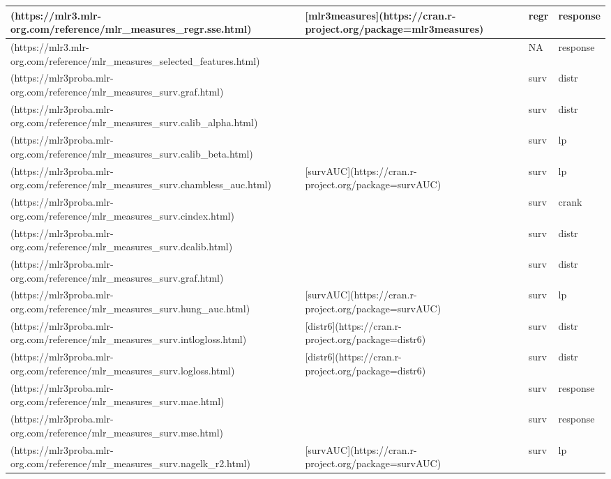 \documentclass[
]{scrbook}
\begin{document}
\begin{tabular}{l|l|l|l}
\hline
[`regr.sse`](https://mlr3.mlr-org.com/reference/mlr\_measures\_regr.sse.html) & [mlr3measures](https://cran.r-project.org/package=mlr3measures) & regr & response\\
\hline
[`selected\_features`](https://mlr3.mlr-org.com/reference/mlr\_measures\_selected\_features.html) &  & NA & response\\
\hline
[`surv.brier`](https://mlr3proba.mlr-org.com/reference/mlr\_measures\_surv.graf.html) &  & surv & distr\\
\hline
[`surv.calib\_alpha`](https://mlr3proba.mlr-org.com/reference/mlr\_measures\_surv.calib\_alpha.html) &  & surv & distr\\
\hline
[`surv.calib\_beta`](https://mlr3proba.mlr-org.com/reference/mlr\_measures\_surv.calib\_beta.html) &  & surv & lp\\
\hline
[`surv.chambless\_auc`](https://mlr3proba.mlr-org.com/reference/mlr\_measures\_surv.chambless\_auc.html) & [survAUC](https://cran.r-project.org/package=survAUC) & surv & lp\\
\hline
[`surv.cindex`](https://mlr3proba.mlr-org.com/reference/mlr\_measures\_surv.cindex.html) &  & surv & crank\\
\hline
[`surv.dcalib`](https://mlr3proba.mlr-org.com/reference/mlr\_measures\_surv.dcalib.html) &  & surv & distr\\
\hline
[`surv.graf`](https://mlr3proba.mlr-org.com/reference/mlr\_measures\_surv.graf.html) &  & surv & distr\\
\hline
[`surv.hung\_auc`](https://mlr3proba.mlr-org.com/reference/mlr\_measures\_surv.hung\_auc.html) & [survAUC](https://cran.r-project.org/package=survAUC) & surv & lp\\
\hline
[`surv.intlogloss`](https://mlr3proba.mlr-org.com/reference/mlr\_measures\_surv.intlogloss.html) & [distr6](https://cran.r-project.org/package=distr6) & surv & distr\\
\hline
[`surv.logloss`](https://mlr3proba.mlr-org.com/reference/mlr\_measures\_surv.logloss.html) & [distr6](https://cran.r-project.org/package=distr6) & surv & distr\\
\hline
[`surv.mae`](https://mlr3proba.mlr-org.com/reference/mlr\_measures\_surv.mae.html) &  & surv & response\\
\hline
[`surv.mse`](https://mlr3proba.mlr-org.com/reference/mlr\_measures\_surv.mse.html) &  & surv & response\\
\hline
[`surv.nagelk\_r2`](https://mlr3proba.mlr-org.com/reference/mlr\_measures\_surv.nagelk\_r2.html) & [survAUC](https://cran.r-project.org/package=survAUC) & surv & lp\\

\end{tabular}
\end{document}
